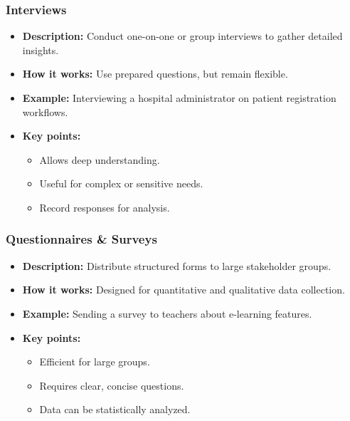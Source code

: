 \documentclass{beamer}
\begin{document}
\begin{frame}[fragile]
  \frametitle{Interviews}
  \begin{itemize}
    \item \textbf{Description:} Conduct one-on-one or group interviews to gather detailed insights.
    \item \textbf{How it works:} Use prepared questions, but remain flexible.
    \item \textbf{Example:} Interviewing a hospital administrator on patient registration workflows.
    \item \textbf{Key points:}
      \begin{itemize}
        \item Allows deep understanding.
        \item Useful for complex or sensitive needs.
        \item Record responses for analysis.
      \end{itemize}
  \end{itemize}
\end{frame}

\begin{frame}[fragile]
  \frametitle{Questionnaires \& Surveys}
  \begin{itemize}
    \item \textbf{Description:} Distribute structured forms to large stakeholder groups.
    \item \textbf{How it works:} Designed for quantitative and qualitative data collection.
    \item \textbf{Example:} Sending a survey to teachers about e-learning features.
    \item \textbf{Key points:}
      \begin{itemize}
        \item Efficient for large groups.
        \item Requires clear, concise questions.
        \item Data can be statistically analyzed.
      \end{itemize}
  \end{itemize}
\end{frame}
\end{document}
